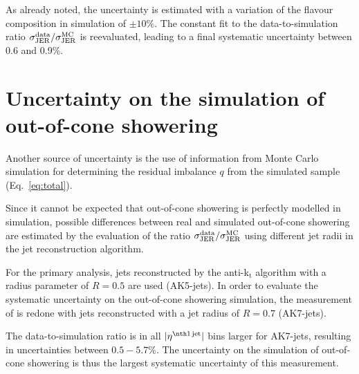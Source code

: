 As already noted, the uncertainty is estimated with a variation of the flavour composition in simulation of $\pm10\%$.
The constant fit to the data-to-simulation ratio $\sigma_\mathrm{JER}^{\text{data}}/\sigma_\mathrm{JER}^{\text{MC}}$ is reevaluated, leading to a final systematic uncertainty between 0.6 and 0.9\%.

\section*{Uncertainty on the simulation of out-of-cone showering}
Another source of uncertainty is the use of information from Monte Carlo simulation for determining the residual imbalance $q$ from the simulated \GAMJET sample (Eq.~\eqref{eq:total}).

Since it cannot be expected that out-of-cone showering is perfectly modelled in simulation, possible differences between real and simulated out-of-cone showering are estimated by the evaluation of the ratio $\sigma_\mathrm{JER}^{\text{data}}/\sigma_\mathrm{JER}^{\text{MC}}$ using different jet radii in the jet reconstruction algorithm. 

For the primary analysis, jets reconstructed by the anti-k$_{\text{t}}$ algorithm with a radius parameter of $R=0.5$ are used (AK5-jets). 
In order to evaluate the systematic uncertainty on the out-of-cone showering simulation, the measurement of \rhores is redone with jets reconstructed with a jet radius of $R=0.7$ (AK7-jets). 

The data-to-simulation ratio is in all $|\etafirstjet|$ bins larger for AK7-jets, resulting in uncertainties between $0.5-5.7\%$.
The uncertainty on the simulation of out-of-cone showering is thus the largest systematic uncertainty of this measurement.

